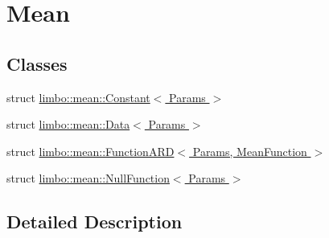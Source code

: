 \hypertarget{group__mean}{}\section{Mean}
\label{group__mean}
\subsection*{Classes}
\begin{DoxyCompactItemize}
\item 
struct \hyperlink{structlimbo_1_1mean_1_1_constant}{limbo\+::mean\+::\+Constant$<$ Params $>$}
\item 
struct \hyperlink{structlimbo_1_1mean_1_1_data}{limbo\+::mean\+::\+Data$<$ Params $>$}
\item 
struct \hyperlink{structlimbo_1_1mean_1_1_function_a_r_d}{limbo\+::mean\+::\+Function\+A\+R\+D$<$ Params, Mean\+Function $>$}
\item 
struct \hyperlink{structlimbo_1_1mean_1_1_null_function}{limbo\+::mean\+::\+Null\+Function$<$ Params $>$}
\end{DoxyCompactItemize}


\subsection{Detailed Description}
